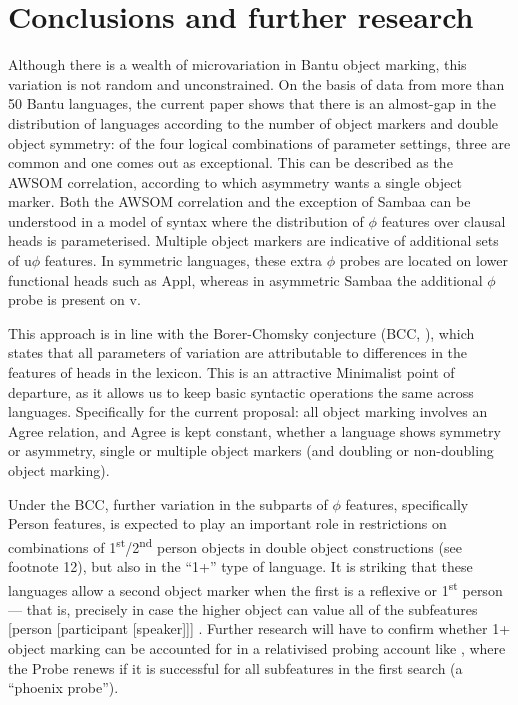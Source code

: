 \documentclass[output=paper
,modfonts
,nonflat]{langsci/langscibook}
\begin{document}
\section{Conclusions and further research} \label{sec-vdwal:8}

Although there is a wealth of microvariation in Bantu object marking, this variation is not random and unconstrained. On the basis of data from more than 50 Bantu languages, the current paper shows that there is an almost-gap in the distribution of languages according to the number of object markers and double object symmetry: of the four logical combinations of parameter settings, three are common and one comes out as exceptional. This can be described as the AWSOM correlation, according to which asymmetry wants a single object marker. Both the AWSOM correlation and the exception of Sambaa can be understood in a model of syntax where the distribution of $\phi$ features over clausal heads is parameterised. Multiple object markers are indicative of additional sets of u$\phi$ features. In symmetric languages, these extra $\phi$ probes are located on lower functional heads such as Appl, whereas in asymmetric Sambaa the additional $\phi$ probe is present on v. 

This approach is in line with the Borer-Chomsky conjecture (BCC, \citealt{Borer1984,Chomsky1995,Baker2008a,Baker2008b}), which states that all parameters of variation are attributable to differences in the features of heads in the lexicon. This is an attractive Minimalist point of departure, as it allows us to keep basic syntactic operations the same across languages. Specifically for the current proposal: all object marking involves an Agree relation, and Agree is kept constant, whether a language shows symmetry or asymmetry, single or multiple object markers (and doubling or non-doubling object marking).

Under the BCC, further variation in the subparts of $\phi$ features, specifically Person features, is expected to play an important role in restrictions on combinations of 1\textsuperscript{st}/2\textsuperscript{nd} person objects in double object constructions (see footnote 12), but also in the “1+” type of language. It is striking that these languages allow a second object marker when the first is a reflexive or 1\textsuperscript{st} person --- that is, precisely in case the higher object can value all of the subfeatures [person [participant [speaker]]] \citep{Bejar_Rezac2009}. Further research will have to confirm whether 1+ object marking can be accounted for in a relativised probing account like \citet{Bejar_Rezac2009}, where the Probe renews if it is successful for all subfeatures in the first search (a “phoenix probe”).
\end{document}
